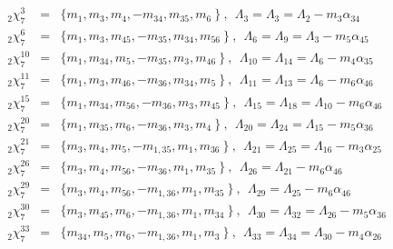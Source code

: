 \documentclass[a4paper]{jpconf}
\def\bb {\begin {eqnarray}}
\def\eqnn#1{\bb\label{#1}}
\def\eea {\end {eqnarray}}
\def\nn{\nonumber}
\def\a{\alpha}
\def\L{\Lambda}
\begin{document}
\eqnn{slt72}
  _2\chi^3_7 &=& \{ m_1, m_{3}, m_{4}, -m_{34}, m_{35}, m_6 \   \} \ ,~~\L_3 = \L_3 = \L_2 - m_3 \a_{34} \\ %
    _2\chi^6_7 &=& \{ m_1, m_{3}, m_{45}, -m_{35}, m_{34}, m_{56} \   \} \ ,~~\L_6 = \L_9 = \L_3 - m_5 \a_{45} \nn\\ %
  _2\chi^{10}_7 &=& \{ m_1, m_{34}, m_{5}, -m_{35}, m_{3}, m_{46} \   \} \ ,~~\L_{10} = \L_{14} =\L_6 - m_4 \a_{35}  \nn\\ %
_2\chi^{11}_7 &=& \{ m_1, m_{3}, m_{46}, -m_{36}, m_{34}, m_{5} \   \} \ ,~~\L_{11} = \L_{13} = \L_6 - m_6 \a_{46}  \nn\\ %
   _2\chi^{15}_7 &=& \{ m_1, m_{34}, m_{56}, -m_{36}, m_{3}, m_{45} \   \} \ ,~~\L_{15} = \L_{18} = \L_{10} - m_6 \a_{46}  \nn\\ %
  _2\chi^{20}_7 &=& \{ m_1, m_{35}, m_{6}, -m_{36}, m_{3}, m_{4} \   \} \ ,~~\L_{20} = \L_{24} = \L_{15} - m_5 \a_{36}  \nn\\ %
_2\chi^{21}_7 &=& \{ m_{3}, m_{4}, m_{5}, -m_{1,35}, m_{1}, m_{36} \   \} \ ,~~\L_{21} = \L_{25} =\L_{16} - m_3 \a_{25} \nn\\ %
  _2\chi^{26}_7 &=& \{ m_{3}, m_{4}, m_{56}, -m_{36}, m_{1}, m_{35} \   \} \ ,~~\L_{26} = \L_{21} - m_6 \a_{46} \nn\\ %
  _2\chi^{29}_7 &=& \{ m_{3}, m_{4}, m_{56}, -m_{1,36}, m_{1}, m_{35} \   \} \ ,~~\L_{29} = \L_{25} - m_6 \a_{46} \nn\\ %
_2\chi^{30}_7 &=& \{ m_{3}, m_{45}, m_{6}, -m_{1,36}, m_{1}, m_{34} \   \} \ ,~~\L_{30} = \L_{32} =\L_{26} - m_5 \a_{36} \nn\\ %
 _2\chi^{33}_7 &=& \{ m_{34}, m_{5}, m_{6}, -m_{1,36}, m_{1}, m_{3} \   \} \ ,~~\L_{33} = \L_{34} = \L_{30} - m_4 \a_{26} \nn %
  \eea
\end{document}
